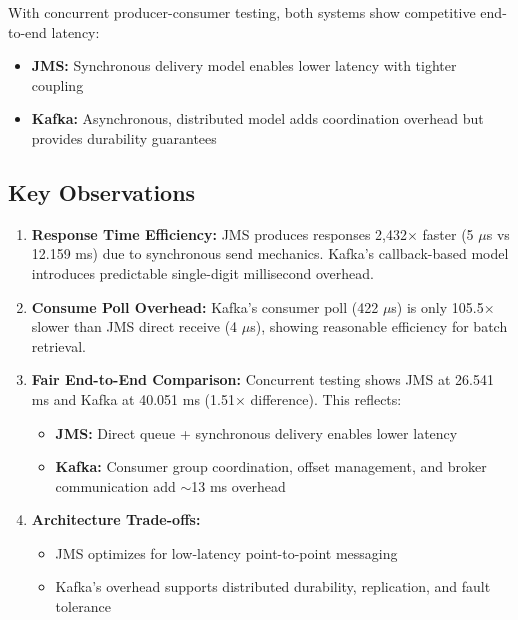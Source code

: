 \documentclass[11pt,a4paper]{article}
\begin{document}
With concurrent producer-consumer testing, both systems show competitive end-to-end
latency:
\begin{itemize}
    \item \textbf{JMS:} Synchronous delivery model enables lower latency with tighter coupling
    \item \textbf{Kafka:} Asynchronous, distributed model adds coordination overhead but provides durability guarantees
\end{itemize}

\subsection{Key Observations}

\begin{enumerate}[leftmargin=*,nosep]
    \item \textbf{Response Time Efficiency:} JMS produces responses 2,432$\times$ faster
          (5 $\mu$s vs 12.159 ms) due to synchronous send mechanics. Kafka's callback-based
          model introduces predictable single-digit millisecond overhead.
    
    \item \textbf{Consume Poll Overhead:} Kafka's consumer poll (422 $\mu$s) is only
          105.5$\times$ slower than JMS direct receive (4 $\mu$s), showing reasonable
          efficiency for batch retrieval.
    
    \item \textbf{Fair End-to-End Comparison:} Concurrent testing shows JMS at
          26.541 ms and Kafka at 40.051 ms (1.51$\times$ difference). This reflects:
          \begin{itemize}
              \item \textbf{JMS:} Direct queue + synchronous delivery enables lower latency
              \item \textbf{Kafka:} Consumer group coordination, offset management, and
                    broker communication add $\sim$13 ms overhead
          \end{itemize}
    
    \item \textbf{Architecture Trade-offs:}
          \begin{itemize}
              \item JMS optimizes for low-latency point-to-point messaging
              \item Kafka's overhead supports distributed durability, replication, and fault tolerance
          \end{itemize}
\end{enumerate}
\end{document}
